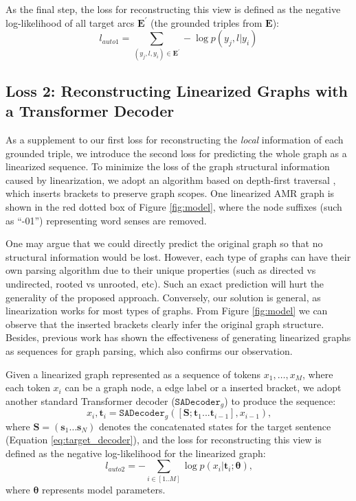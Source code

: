\documentclass[11pt,a4paper]{article}
\begin{document}
As the final step, the loss for reconstructing this view is defined as the negative log-likelihood of all target arcs $\boldsymbol{E}^\prime$ (the grounded triples from $\boldsymbol{E}$):
\begin{equation}
    l_{auto1} = \sum_{(y_j,l,y_i)\in \boldsymbol{E}^\prime} -\log p(y_j,l|y_i)
\end{equation}


\subsection{Loss 2: Reconstructing Linearized Graphs with a Transformer Decoder}


As a supplement to our first loss for reconstructing the \emph{local} information of each grounded triple, we introduce the second loss for predicting the whole graph as a linearized sequence.
To minimize the loss of the graph structural information caused by linearization, we adopt an algorithm based on depth-first traversal \citep{konstas2017neural}, which inserts brackets to preserve graph scopes.
One linearized AMR graph is shown in the red dotted box of Figure \ref{fig:model}, where the node suffixes (such as ``-01'') representing word senses are removed.


One may argue that we could directly predict the original graph so that no structural information would be lost.
However, each type of graphs can have their own parsing algorithm due to their unique properties (such as directed vs undirected, rooted vs unrooted, etc).
Such an exact prediction will hurt the generality of the proposed approach.
Conversely, our solution is general, as linearization works for most types of graphs.
From Figure \ref{fig:model} we can observe that the inserted brackets clearly infer the original graph structure.
Besides, previous work \citep{iyer2017learning,konstas2017neural} has shown the effectiveness of generating linearized graphs as sequences for
graph parsing, which also confirms our observation.


Given a linearized graph represented as a sequence of tokens $x_1,\dots,x_M$, 
where each token $x_i$ can be a graph node, a edge label or a inserted bracket, 
we adopt another standard Transformer decoder ($\mathtt{SADecoder}_{g}$) to produce the sequence:
\begin{equation} \label{eq:linearize_decoder}
    x_i, \boldsymbol{t}_i = \mathtt{SADecoder}_{g}([\boldsymbol{S};\boldsymbol{t}_1...\boldsymbol{t}_{i-1}],x_{i-1}) \text{,}
\end{equation}
where $\boldsymbol{S}=(\boldsymbol{s}_1\dots\boldsymbol{s}_N)$ denotes the concatenated states for the target sentence (Equation \ref{eq:target_decoder}), and the loss for reconstructing this view is defined as the negative log-likelihood for the linearized graph:
\begin{equation}
    l_{auto2} = - \sum_{i\in[1..M]} \log p(x_i|\boldsymbol{t}_i;\boldsymbol{\theta}) \text{,}
\end{equation}
where $\boldsymbol{\theta}$ represents model parameters.
\end{document}
